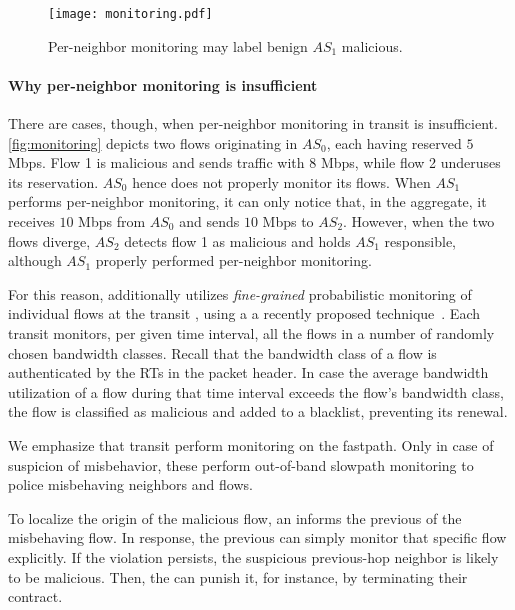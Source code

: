 \begin{figure}[t]
  \begin{center}
    \texttt{[image: monitoring.pdf]}
  \end{center}
  \vspace{-3mm}
  \caption{Per-neighbor monitoring may label benign $AS_1$ malicious.}
  \vspace{-7mm}
  \label{fig:monitoring}
\end{figure}

\paragraph{Why per-neighbor monitoring is insufficient} There are cases,
though, when per-neighbor monitoring in transit \ADs is insufficient.
\autoref{fig:monitoring} depicts two flows originating in $AS_0$, each having
reserved $5$ Mbps. Flow 1 is malicious and sends traffic with $8$ Mbps, while
flow 2 underuses its reservation. $AS_0$ hence does not properly monitor its
flows.  When $AS_1$ performs per-neighbor monitoring, it can only notice that,
in the aggregate, it receives $10$ Mbps from $AS_0$ and sends $10$ Mbps to $AS_2$.
However, when the two flows diverge, $AS_2$ detects flow 1 as malicious and
holds $AS_1$ responsible, although $AS_1$ properly performed per-neighbor
monitoring. 

For this reason, \name additionally utilizes \textit{fine-grained} probabilistic
monitoring of individual flows at the transit \ADs, using a a recently proposed
technique~\cite{hao}. Each transit \AD monitors, per given time interval, all
the flows in a number of randomly chosen bandwidth classes.  Recall that the
bandwidth class of a flow is authenticated by the RTs in the packet header.  In
case the average bandwidth utilization of a flow during that time interval
exceeds the flow's bandwidth class, the flow is classified as malicious and
added to a blacklist, preventing its renewal.
  

We emphasize that transit \ADs perform monitoring on the fastpath.  Only in
case of suspicion of misbehavior, these \ADs perform out-of-band slowpath
monitoring to police misbehaving neighbors and flows.

To localize the origin \AD of the malicious flow, an \AD informs the previous
\AD of the misbehaving flow. In response, the previous \AD can simply monitor
that specific flow explicitly.  If the violation persists, the suspicious
previous-hop neighbor is likely to be malicious. Then, the \AD can punish it,
for instance, by terminating their contract.


